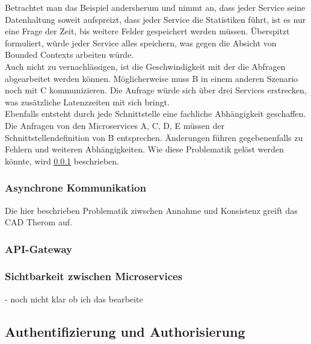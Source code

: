 Betrachtet man das Beispiel andersherum und nimmt an, dass jeder Service seine Datenhaltung soweit aufspreizt, dass jeder Service die Statistiken führt, ist es nur eine Frage der Zeit, bis weitere Felder gespeichert werden müssen. Überspitzt formuliert, würde jeder Service alles speichern, was gegen die Absicht von Bounded Contexts arbeiten würde.\cite{wolff2018mic_praxis} \\

Auch nicht zu vernachlässigen, ist die Geschwindigkeit mit der die Abfragen abgearbeitet werden können. Möglicherweise muss B in einem anderen Szenario noch mit C kommunizieren. Die Anfrage würde sich über drei Services erstrecken, was zusätzliche Latenzzeiten mit sich bringt.\cite{wolff2018mic_praxis} \\   

Ebenfalls entsteht durch jede Schnittstelle eine fachliche Abhängigkeit geschaffen.\cite{bruce2019mic_in_action} Die Anfragen von den Microservices A, C, D, E müssen der Schnittstellendefinition von B entsprechen. Änderungen führen gegebenenfalls zu Fehlern und weiteren Abhängigkeiten. Wie diese Problematik gelöst werden könnte, wird \ref{sec:asynchrone_kommunikation} beschrieben. \\

\subsubsection{Asynchrone Kommunikation}\label{sec:asynchrone_kommunikation}

Die hier beschrieben Problematik ziwschen Annahme und Konsistenz greift das CAD Therom auf.  



\subsubsection{API-Gateway}

\subsubsection{Sichtbarkeit zwischen Microservices}
 - noch nicht klar ob ich das bearbeite




\subsection{Authentifizierung und Authorisierung}



